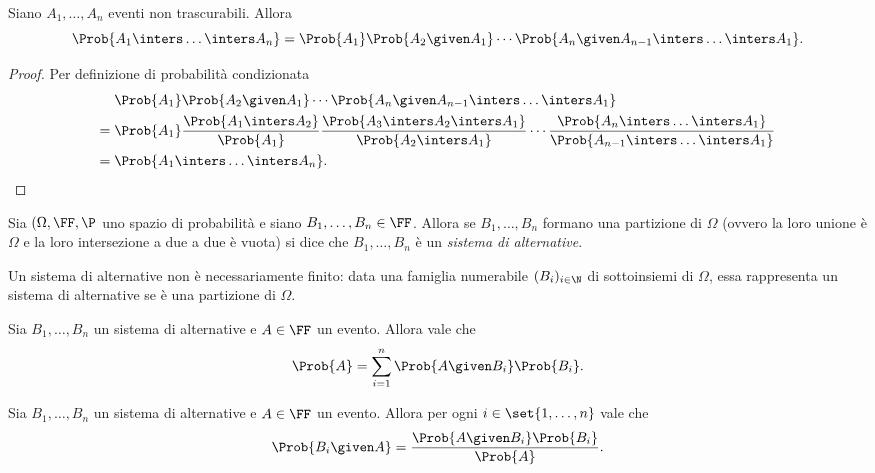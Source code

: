 \begin{proposition}
    Siano $A_1, \dots, A_n$ eventi non trascurabili. Allora \[
        \Prob{A_1 \inters \dots \inters A_n} = \Prob{A_1}\Prob{A_2 \given A_1}\cdots \Prob{A_n \given A_{n-1} \inters \dots \inters A_1}.    
    \]
\end{proposition}
\begin{proof}
    Per definizione di probabilità condizionata \begin{align*}
        &\Prob{A_1}\Prob{A_2 \given A_1}\cdots \Prob{A_n \given A_{n-1} \inters \dots \inters A_1}\\
        = {}&{}\Prob{A_1}
        \frac{\Prob{A_1 \inters A_2}}{\Prob{A_1}}
        \frac{\Prob{A_3 \inters A_2 \inters A_1}}{\Prob{A_2 \inters A_1}}
        \cdots 
        \frac{\Prob{A_n \inters \dots \inters A_1}}{\Prob{A_{n-1} \inters \dots \inters A_1}}\\
        = {}&{}\Prob{A_1 \inters \dots \inters A_n}. \qedhere
    \end{align*}
\end{proof}

\begin{definition}
    Sia $(\Omega, \FF, \P$ uno spazio di probabilità e siano $B_1, \dots, B_n \in \FF$. Allora se $B_1, \dots, B_n$ formano una partizione di $\Omega$ (ovvero la loro unione è $\Omega$ e la loro intersezione a due a due è vuota) si dice che $B_1, \dots, B_n$ è un \emph{sistema di alternative}.
\end{definition}
\begin{remark}
    Un sistema di alternative non è necessariamente finito: data una famiglia numerabile $(B_i)_{i \in \N}$ di sottoinsiemi di $\Omega$, essa rappresenta un sistema di alternative se è una partizione di $\Omega$.
\end{remark}

\begin{proposition}
    Sia $B_1, \dots, B_n$ un sistema di alternative e $A \in \FF$ un evento. Allora vale che \[
        \Prob{A} = \sum_{i = 1}^n \Prob{A \given B_i}\Prob{B_i}.    
    \]
\end{proposition}

\begin{proposition}
    Sia $B_1, \dots, B_n$ un sistema di alternative e $A \in \FF$ un evento. Allora per ogni $i \in \set{1, \dots, n}$ vale che \[
        \Prob{B_i \given A} = \frac{\Prob{A \given B_i}\Prob{B_i}}{\Prob{A}}.    
    \]
\end{proposition}

